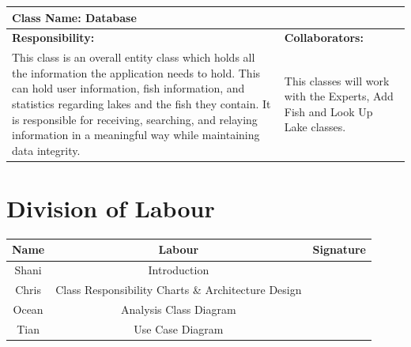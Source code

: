 \documentclass[]{article}
\begin{document}
	\begin{table}[ht]
		\centering
		\begin{tabular}{|p{5cm}|p{5cm}|}
		\hline
		 \multicolumn{2}{|l|}{\textbf{Class Name: Database}} \\
		\hline
		\textbf{Responsibility:} & \textbf{Collaborators:} \\
		\hline
		This class is an overall entity class which holds all the information the application needs to hold. This can hold user information, fish information, and statistics regarding lakes and the fish they contain. It is responsible for receiving, searching, and relaying information in a meaningful way while maintaining data integrity. & This classes will work with the Experts, Add Fish and Look Up Lake classes. \\
		\hline
		\end{tabular}
	\end{table}

\FloatBarrier

\appendix
\section{Division of Labour}
\label{sec:division_of_labour}
\begin{center}
\begin{tabular}{ |c|c|c| }
 \hline
 Name & Labour & Signature              \\ \hline
 Shani & Introduction & \\
 Chris & Class Responsibility Charts \& Architecture Design &  \\
 Ocean & Analysis Class Diagram &  \\
 Tian & Use Case Diagram & \\
 \hline
\end{tabular}
\end{center}

\newpage

\listoffigures
\end{document}

